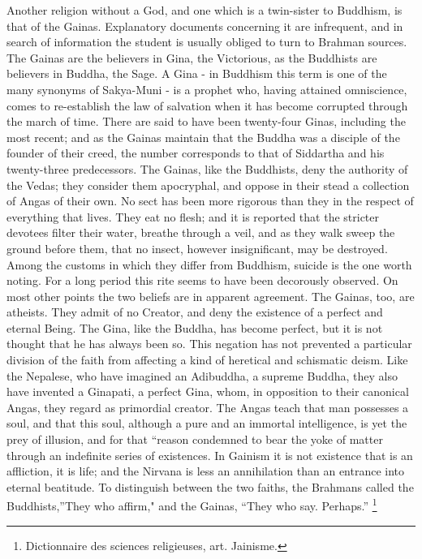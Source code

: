 \documentclass[]{book}
\let\rmarkdownfootnote\footnote%
\def\footnote{\protect\rmarkdownfootnote}
\begin{document}
Another religion without a God, and one which is a twin-sister to
Buddhism, is that of the Gainas. Explanatory documents concerning it are
infrequent, and in search of information the student is usually obliged
to turn to Brahman sources. The Gainas are the believers in Gina, the
Victorious, as the Buddhists are believers in Buddha, the Sage. A Gina -
in Buddhism this term is one of the many synonyms of Sakya-Muni - is a
prophet who, having attained omniscience, comes to re-establish the law
of salvation when it has become corrupted through the march of time.
There are said to have been twenty-four Ginas, including the most
recent; and as the Gainas maintain that the Buddha was a disciple of the
founder of their creed, the number corresponds to that of Siddartha and
his twenty-three predecessors. The Gainas, like the Buddhists, deny the
authority of the Vedas; they consider them apocryphal, and oppose in
their stead a collection of Angas of their own. No sect has been more
rigorous than they in the respect of everything that lives. They eat no
flesh; and it is reported that the stricter devotees filter their water,
breathe through a veil, and as they walk sweep the ground before them,
that no insect, however insignificant, may be destroyed. Among the
customs in which they differ from Buddhism, suicide is the one worth
noting. For a long period this rite seems to have been decorously
observed. On most other points the two beliefs are in apparent
agreement. The Gainas, too, are atheists. They admit of no Creator, and
deny the existence of a perfect and eternal Being. The Gina, like the
Buddha, has become perfect, but it is not thought that he has always
been so. This negation has not prevented a particular division of the
faith from affecting a kind of heretical and schismatic deism. Like the
Nepalese, who have imagined an Adibuddha, a supreme Buddha, they also
have invented a Ginapati, a perfect Gina, whom, in opposition to their
canonical Angas, they regard as primordial creator. The Angas teach that
man possesses a soul, and that this soul, although a pure and an
immortal intelligence, is yet the prey of illusion, and for that
``reason condemned to bear the yoke of matter through an indefinite
series of existences. In Gainism it is not existence that is an
affliction, it is life; and the Nirvana is less an annihilation than an
entrance into eternal beatitude. To distinguish between the two faiths,
the Brahmans called the Buddhists,''They who affirm," and the Gainas,
``They who say. Perhaps.'' \footnote{Dictionnaire des sciences
  religieuses, art. Jainisme.}
\end{document}
